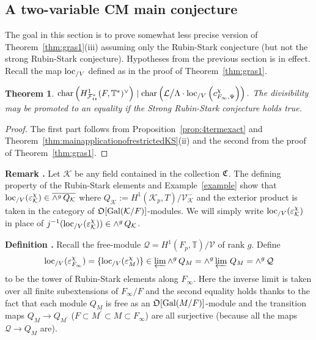 \documentclass[12pt]{amsart}
\numberwithin{equation}{section}
\newtheorem{thm}{Theorem}[section]
\newenvironment{define}{\par\medskip\noindent\refstepcounter{thm}
\bgroup{\hspace*{-0.15 cm}\bf{Definition}
\thethm.}\bgroup}{\egroup \egroup\par\medskip}
\newenvironment{rem}{\par\medskip\noindent\refstepcounter{thm}
\bgroup{\hspace*{-0.15 cm}\bf{Remark} \thethm.}\bgroup}{\egroup
\egroup\par\medskip} \parskip 2pt
\begin{document}
\subsection{A two-variable CM main conjecture}
\label{subsecCMmainconj}
The goal in this section is to prove somewhat less precise version of Theorem~\ref{thm:gras1}(iii)   assuming only the Rubin-Stark conjecture (but not the strong Rubin-Stark conjecture). Hypotheses from the previous section is in effect. Recall the map ${\textup{loc}_{/V}}$ defined as in the proof of Theorem~\ref{thm:gras1}.
\begin{thm}
\label{thm:mainconjforTchi} $\textup{char}\left(H^1_{{\mathcal{F}}^*_{\frak{tr}}}(F,{\mathbb{T}}^*)^\vee\right) \mid
\textup{char} \left(\frak{\mathcal{L}}\big{/}{\Lambda}\cdot  {\textup{loc}_{/V}}\left(c_{F_\infty,\Psi}^\chi \right)\right).$ The divisibility may be promoted to an equality if the Strong Rubin-Stark conjecture holds true.
\end{thm}
\begin{proof}
The first part follows from Proposition~\ref{prop:4termexact} and Theorem~\ref{thm:mainapplicationofrestrictedKS}(ii) and the second from the proof of Theorem~\ref{thm:gras1}.
\end{proof}
\begin{rem}
\label{rem:RSinwedge0}
Let ${\mathcal{K}}$ be any field contained in the collection $\frak{C}$. The defining property of the Rubin-Stark elements and Example~\ref{example} show that ${\textup{loc}_{/V}}(\varepsilon_\mathcal{K}^\chi) \in \overline{\wedge^g\,Q_{\mathcal{K}}}$ 
where $Q_{\mathcal{K}}:=H^1({\mathcal{K}}_p,T)/\mathcal{V}_{\mathcal{K}}^-$ and the exterior product is taken in the category of ${\frak{O}}[\textup{Gal}({\mathcal{K}}/F)]$-modules. We will simply write ${\textup{loc}_{/V}}(\varepsilon_\mathcal{K}^\chi)$ in place of $j^{-1}({\textup{loc}_{/V}}(\varepsilon_\mathcal{K}^\chi)) \in  \wedge^g\,Q_{\mathcal{K}}$. 
\end{rem}
\begin{define}
\label{def:rubinstarktowerlocal}
Recall the free-module $\mathcal{Q}=H^1(F_p,{\mathbb{T}})/\mathcal{V}$ of rank $g$.  Define
$${\textup{loc}_{/V}}(\varepsilon_{F_\infty}^\chi)=\{{\textup{loc}_{/V}}(\varepsilon_M^\chi)\} \in \varprojlim \wedge^g\, Q_M=\wedge^g\varprojlim\, Q_M=\wedge^g \,\mathcal{Q}$$
to be the tower of Rubin-Stark elements along $F_\infty$. Here the inverse limit is taken over all finite subextensions  of $F_\infty/F$ and the second equality holds thanks to the fact that each module $Q_M$ is free as an ${\frak{O}}[\textup{Gal}(M/F)]$-module and the transition maps $Q_M {\rightarrow} Q_{M^\prime}$ ($F\subset M^\prime\subset M \subset F_\infty$) are all surjective (because all the maps $\mathcal{Q}{\rightarrow} Q_M$ are). 
\end{define}
\end{document}
